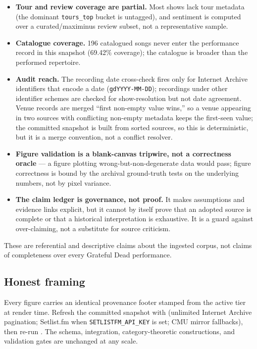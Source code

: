 \documentclass[
]{article}
\begin{document}
\begin{itemize}
   and summarized
  in Figure \ref{fig:venue_identity_review}.
\item
  \textbf{Tour and review coverage are partial.} Most shows lack tour
  metadata (the dominant \texttt{tours\_top} bucket is untagged), and
  sentiment is computed over a curated/maximinus review subset, not a
  representative sample.
\item
  \textbf{Catalogue coverage.} 196 catalogued songs never enter the
  performance record in this snapshot (69.42\% coverage); the catalogue
  is broader than the performed repertoire.
\item
  \textbf{Audit reach.} The recording date cross-check fires only for
  Internet Archive identifiers that encode a date
  (\texttt{gdYYYY-MM-DD}); recordings under other identifier schemes are
  checked for show-resolution but not date agreement. Venue records are
  merged ``first non-empty value wins,'' so a venue appearing in two
  sources with conflicting non-empty metadata keeps the first-seen
  value; the committed snapshot is built from sorted sources, so this is
  deterministic, but it is a merge convention, not a conflict resolver.
\item
  \textbf{Figure validation is a blank-canvas tripwire, not a
  correctness oracle} --- a figure plotting wrong-but-non-degenerate
  data would pass; figure correctness is bound by the archival
  ground-truth tests on the underlying numbers, not by pixel variance.
\item
  \textbf{The claim ledger is governance, not proof.} It makes
  assumptions and evidence links explicit, but it cannot by itself prove
  that an adopted source is complete or that a historical interpretation
  is exhaustive. It is a guard against over-claiming, not a substitute
  for source criticism.
\end{itemize}

These are referential and descriptive claims about the ingested corpus,
not claims of completeness over every Grateful Dead performance.

\subsection{Honest framing}\label{honest-framing}

Every figure carries an identical provenance footer stamped from the
active tier at render time. Refresh the committed snapshot with
(unlimited Internet Archive pagination; Setlist.fm when
\texttt{SETLISTFM\_API\_KEY} is set; CMU mirror fallbacks), then re-run
. The schema,
integration, category-theoretic constructions, and validation gates are
unchanged at any scale.
\end{document}
